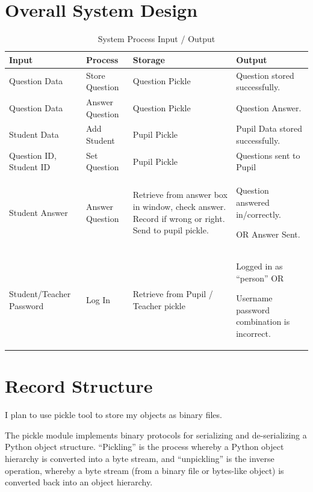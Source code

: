\documentclass[a4paper,12pt]{report}
\begin{document}
\section{Overall System Design}


\begin{flushleft}
\begin{table}
\tablefirsthead{}
\tablehead{}
\tabletail{}
\tablelasttail{}
\begin{supertabular}{|m{1.6566598in}|m{1.5955598in}|m{1.6011599in}|m{1.6240599in}|}
\hline
Input &
Process &
Storage &
Output\\\hline
Question Data &
Store Question &
Question Pickle &
Question stored successfully.\\\hline
Question Data &
Answer Question &
Question Pickle &
Question Answer.\\\hline
Student Data &
Add Student &
Pupil Pickle &
Pupil Data stored successfully.\\\hline
Question ID, Student ID &
Set Question &
Pupil Pickle &
Questions sent to Pupil\\\hline
Student Answer &
Answer Question &
Retrieve from answer box in window, check answer. Record if wrong or right. Send to pupil pickle. &
Question answered in/correctly.

OR\newline
Answer Sent.\\\hline
Student/Teacher Password &
Log In &
Retrieve from Pupil / Teacher pickle &
Logged in as ``person''\newline
OR

Username password combination is incorrect.\\\hline
\end{supertabular}
\caption{System Process Input / Output}
\end{table}
\item
\end{flushleft}

\section{Record Structure}


\bigskip

I plan to use pickle tool to store my objects as binary files.

The pickle module implements binary protocols for serializing and de-serializing a Python object structure. ``Pickling'' is the process whereby a Python object hierarchy is converted into a byte stream, and ``unpickling'' is the inverse operation, whereby a byte stream (from a binary file or bytes-like object) is converted back into an object hierarchy.
\end{document}

